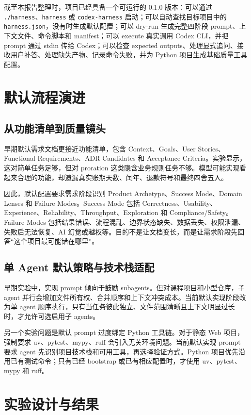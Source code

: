 \documentclass[11pt,a4paper]{article}
\newcommand{\code}[1]{\texttt{\small #1}}
\begin{document}
截至本报告整理时，项目已经具备一个可运行的 0.1.0 版本：可以通过 \code{./harness}、\code{harness} 或 \code{codex-harness} 启动；可以自动查找目标项目中的 \code{harness.json}，没有时生成默认配置；可以 dry-run 生成完整四阶段 prompt、上下文文件、命令脚本和 manifest；可以 execute 真实调用 Codex CLI，并把 prompt 通过 stdin 传给 Codex；可以检查 expected outputs、处理显式追问、接收用户补答、处理缺失产物、记录命令失败，并为 Python 项目生成基础质量工具配置。

\section{默认流程演进}

\subsection{从功能清单到质量镜头}

早期默认需求文档更接近功能清单，包含 Context、Goals、User Stories、Functional Requirements、ADR Candidates 和 Acceptance Criteria。实验显示，这对简单任务足够，但对 proration 这类隐含业务规则任务不够。模型可能实现看起来合理的功能，却遗漏真实账期天数、闰年、退款符号和最终四舍五入。

因此，默认配置要求需求阶段识别 Product Archetype、Success Mode、Domain Lenses 和 Failure Modes。Success Mode 包括 Correctness、Usability、Experience、Reliability、Throughput、Exploration 和 Compliance/Safety。Failure Modes 包括结果错误、流程混乱、边界状态缺失、数据丢失、权限泄漏、失败后无法恢复、AI 幻觉或越权等。目的不是让文档变长，而是让需求阶段先回答“这个项目最可能错在哪里”。

\subsection{单 Agent 默认策略与技术栈适配}

早期实验中，实现 prompt 倾向于鼓励 subagents。但对课程项目和小型仓库，子 agent 并行会增加文件所有权、合并顺序和上下文冲突成本。当前默认实现阶段改为单 agent 顺序执行，只有当任务彼此独立、文件范围清晰且上下文明显过长时，才允许可选启用子 agents。

另一个实验问题是默认 prompt 过度绑定 Python 工具链。对于静态 Web 项目，强制要求 uv、pytest、mypy、ruff 会引入无关环境问题。当前默认实现 prompt 要求 agent 先识别项目技术栈和可用工具，再选择验证方式。Python 项目优先沿用已有测试命令；只有已经 bootstrap 或已有相应配置时，才使用 uv、pytest、mypy 和 ruff。

\section{实验设计与结果}
\end{document}
